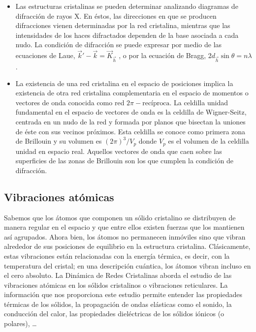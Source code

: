 \documentclass[11pt]{article}
\begin{document}
\begin{itemize}
\item Las estructuras cristalinas se pueden determinar analizando diagramas de difracción de rayos X. En éstos, las direcciones en que se producen difracciones vienen determinadas por la red cristalina, mientras que las intensidades de los haces difractados dependen de la base asociada a cada nudo. La condición de difracción se puede expresar por medio de las ecuaciones de Laue, \(\vec k'- \vec k=\vec K_{\vec h}\) , o por la ecuación de Bragg, \(2d_{\vec h} \sin\theta = n\lambda\) .

\item La existencia de una red cristalina en el espacio de posiciones implica la existencia de otra red cristalina complementaria en el espacio de momentos o vectores de onda conocida como red \(2\pi-\text{recíproca}\). La celdilla unidad fundamental en el espacio de vectores de onda es la celdilla de Wigner-Seitz, centrada en un nudo de la red y formada por planos que bisectan la uniones de éste con sus vecinos próximos. Esta celdilla se conoce como primera zona de Brillouin y su volumen es \((2\pi)^3/V_p\) donde \(V_p\) es el volumen de la celdilla unidad en espacio real. Aquellos vectores de onda que caen sobre las superficies de las zonas de Brillouin son los que cumplen la condición de difracción.
\end{itemize}

\subsection{Vibraciones atómicas}
\label{sec:org27b1c50}

Sabemos que los átomos que componen un sólido cristalino se distribuyen de manera regular en el espacio y que entre ellos existen fuerzas que los mantienen así agrupados. Ahora bien, los átomos no permanecen inmóviles sino que vibran alrededor de sus posiciones de equilibrio en la estructura cristalina. Clásicamente, estas vibraciones están relacionadas con la energía térmica, es decir, con la temperatura del cristal; en una descripción cuántica, los átomos vibran incluso en el cero absoluto. La Dinámica de Redes Cristalinas aborda el estudio de las vibraciones atómicas en los sólidos cristalinos o
vibraciones reticulares. La información que nos proporciona este estudio permite entender las propiedades térmicas de los sólidos, la propagación de ondas elásticas como el sonido, la conducción del calor, las propiedades dieléctricas de los sólidos iónicos (o polares), \ldots{}
\end{document}
